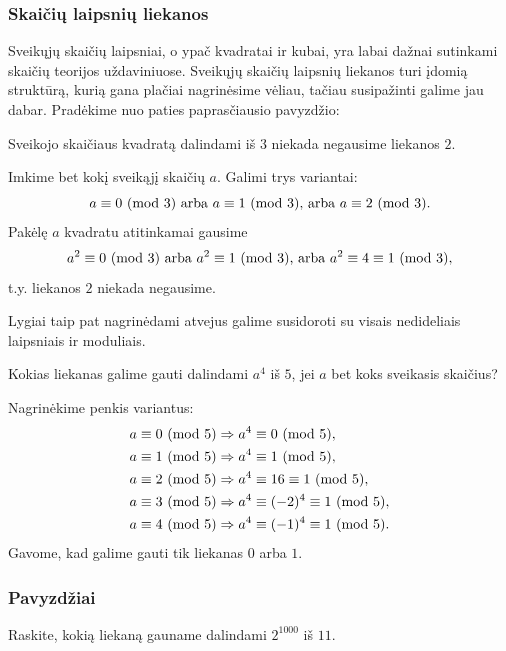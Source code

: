 \subsubsection{Skaičių laipsnių liekanos} 

Sveikųjų skaičių laipsniai, o ypač kvadratai ir kubai, yra labai dažnai
sutinkami skaičių teorijos uždaviniuose. Sveikųjų skaičių laipsnių liekanos
turi įdomią struktūrą, kurią gana plačiai nagrinėsime vėliau, tačiau
susipažinti galime jau dabar. Pradėkime nuo paties paprasčiausio pavyzdžio:

\begin{pav} 
  Sveikojo skaičiaus kvadratą dalindami iš $3$ niekada negausime liekanos
  $2$.  
\end{pav}

\noindent Imkime bet kokį sveikąjį skaičių $a$. Galimi trys variantai: 
$$a\equiv 0 \ (\text{mod } 3) \text{ arba } a\equiv 1 \ (\text{mod } 3) \text{, arba } a\equiv 2
\ (\text{mod } 3).$$ 
Pakėlę $a$ kvadratu atitinkamai gausime
$$a^2\equiv 0 \ (\text{mod } 3) \text{ arba } a^2\equiv 1 \ (\text{mod } 3) \text{, arba } a^2\equiv
4\equiv 1 \ (\text{mod } 3),$$
t.y. liekanos $2$ niekada negausime.

Lygiai taip pat nagrinėdami atvejus galime susidoroti su visais nedideliais
laipsniais ir moduliais.

\begin{pav} Kokias liekanas galime gauti dalindami $a^4$ iš $5$, jei $a$
  bet koks sveikasis skaičius?  
\end{pav}

Nagrinėkime penkis variantus: 
\begin{align*} 
  a&\equiv 0 \ (\text{mod } 5) \Rightarrow a^4 \equiv 0 \ (\text{mod } 5), \\ 
  a&\equiv 1 \ (\text{mod } 5) \Rightarrow a^4 \equiv 1 \ (\text{mod } 5), \\
  a&\equiv 2 \ (\text{mod } 5) \Rightarrow a^4 \equiv 16 \equiv 1 \ (\text{mod } 5), \\ 
  a&\equiv 3 \ (\text{mod } 5) \Rightarrow a^4 \equiv (-2)^4 \equiv 1 \ (\text{mod } 5), \\ 
  a&\equiv 4 \ (\text{mod } 5) \Rightarrow a^4 \equiv (-1)^4 \equiv 1 \ (\text{mod } 5). 
\end{align*} 
Gavome, kad galime gauti tik liekanas $0$ arba $1$.

\subsubsection{Pavyzdžiai}

\begin{pavnr} 
  Raskite, kokią liekaną gauname dalindami $2^{1000}$ iš $11$.
\end{pavnr} 

